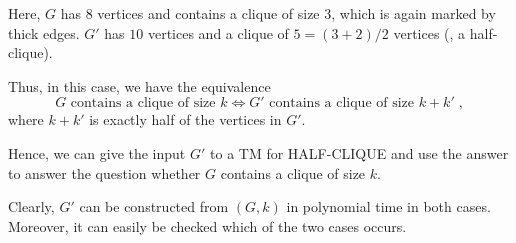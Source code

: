 \documentclass{exercise}
\begin{document}
\begin{solution}
    Here, $G$ has $8$ vertices and contains a clique of size $3$, which is
    again marked by thick edges.  $G'$ has $10$ vertices and a clique of
    $5=(3+2)/2$ vertices (\ie, a half-clique).

    Thus, in this case, we have the equivalence
    \[ G \text{ contains a clique of size } k \iff G'\text{ contains a clique of size } k+k'\;, \]
    where $k+k'$ is exactly half of the vertices in $G'$.

    Hence, we can give the input $G'$ to a TM for HALF-CLIQUE and use the answer to
    answer the question whether $G$ contains a clique of size $k$.

    Clearly, $G'$ can be constructed from $(G,k)$ in polynomial time in both cases.
    Moreover, it can easily be checked which of the two cases occurs.
  \end{solution}
\end{document}
